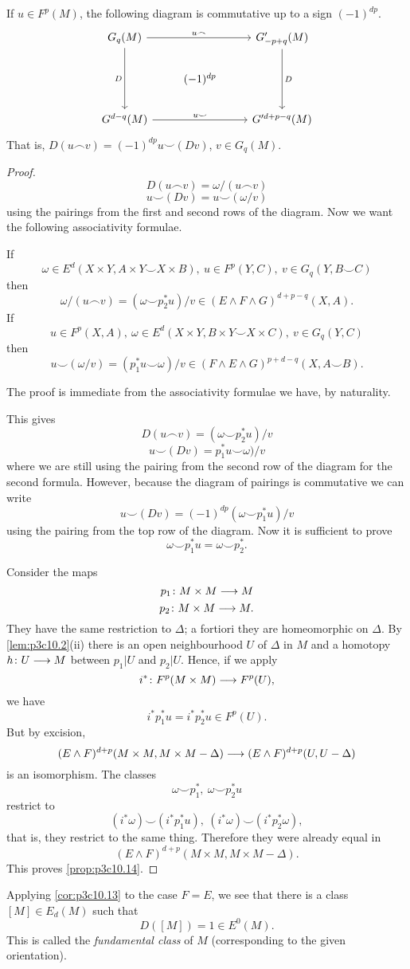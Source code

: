 \documentclass[../main]{subfiles}
\begin{document}
\begin{proposition}\label{prop:p3c10.14}
If $u \in F^p(M)$, the following diagram is commutative up to a sign $(-1)^{dp}$.
\[
\begin{tikzcd}
G_q(M) \arrow[rr, "u \frown"] \arrow[dd, "D"'] &           & G'_{-p + q}(M) \arrow[dd, "D"] \\
                                               & (-1)^{dp} &                                \\
G^{d - q}(M) \arrow[rr, "u \smile"]            &           & G'^{d + p - q}(M)             
\end{tikzcd}
\] 
That is, $D(u \frown v) = (-1)^{dp} u \smile (Dv)$, $v \in G_q(M)$.
\end{proposition}
\begin{proof}
\[D(u \frown v) = \omega / (u \frown v)\] 
\[u \smile (Dv) = u \smile (\omega / v)\]
using the pairings from the first and second rows of the diagram.
Now we want the following associativity formulae.
\begin{lemma}\label{lem:p3c10.15}
If
\[\omega \in E^d(X \times Y, A \times Y \smile X \times B), \ u \in F^p(Y,C), \ v \in G_q(Y,B \smile C)\]
then 
\[\omega / (u \frown v) = (\omega \smile p_2^*u)/v \in (E \wedge F \wedge G)^{d+p-q}(X,A).\]
If \[u \in F^p(X,A), \ \omega \in E^d(X \times Y, B \times Y \smile X \times C), \ v \in G_q(Y,C)\]
then
\[u \smile (\omega / v) = (p_1^* u \smile \omega)/v \in (F \wedge E \wedge G)^{p+d-q}(X,A \smile B).\]
\end{lemma}
The proof is immediate from the associativity formulae we have, by naturality.

This gives
\[D(u \frown v) = (\omega \smile p_2^* u)/v\]
\[u \smile (Dv) = p_1^* u \smile \omega)/v\]
where we are still using the pairing from the second row of the diagram for the second formula. However, because the diagram of pairings is commutative we can write 
\[u \smile (Dv) = (-1)^{dp}(\omega \smile p_1^* u)/v\]
using the pairing from the top row of the diagram. Now it is sufficient to prove
\[\omega \smile p_1^* u = \omega \smile p_2^*.\]

Consider the maps
\[p_1 \colon M \times M \longrightarrow M\]
\[p_2 \colon M \times M \longrightarrow M.\]
They have the same restriction to $\Delta$; a fortiori they are homeomorphic on $\Delta$. By \ref{lem:p3c10.2}(ii) there is an open neighbourhood $U$ of $\Delta$ in $M$ and a homotopy $h \colon U \longrightarrow M$  between $p_1|U$ and $p_2|U$. Hence, if we apply
\[i^*\colon F^p(M \times M) \longrightarrow F^p(U),\]
we have
\[i^* p^*_1 u = i^* p^*_2 u \in F^p(U).\]
But by excision,
\[(E \wedge F)^{d+p}(M \times M, M \times M - \Delta) \longrightarrow (E \wedge F)^{d+p}(U,U-\Delta)\]
is an isomorphism. The classes 
\[\omega \smile p_1^*, \ \omega \smile p_2^*u\]
restrict to 
\[(i^*\omega) \smile (i^*p_1^*u), \ (i^*\omega) \smile (i^* p_2^* \omega),\]
that is, they restrict to the same thing. Therefore they were already equal in
\[(E \wedge F)^{d+p}(M \times M, M \times M - \Delta).\]
This proves \ref{prop:p3c10.14}.
\end{proof}
Applying \ref{cor:p3c10.13} to the case $F=E$, we see that there is a class $[M] \in E_d(M)$ such that
\[D([M]) = 1 \in E^0(M).\]
This is called the \emph{fundamental class} of $M$ (corresponding to the given orientation).
\end{document}
